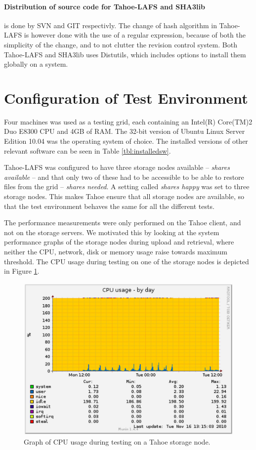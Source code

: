 \documentclass[english,12pt,a4paper]{book}
\begin{document}
\paragraph{Distribution of source code for Tahoe-LAFS and SHA3lib} is done by
\ac{SVN} and GIT respectivly. The change of hash algorithm in Tahoe-LAFS is
however done with the use of a regular expression, because of both the
simplicity of the change, and to not clutter the revision control system. Both
Tahoe-LAFS and SHA3lib uses \ac{Distutils}, which includes options to install
them globally on a system.

\section{Configuration of Test Environment}

Four machines was used as a testing grid, each containing an Intel(R) Core(TM)2
Duo E8300 \ac{CPU} and 4GB of \ac{RAM}. The 32-bit version of Ubuntu Linux
Server Edition 10.04 was the operating system of choice. The installed versions
of other relevant software can be seen in Table \ref{tbl:installedsw}.



Tahoe-\ac{LAFS} was configured to have three storage nodes available --
\emph{shares available} -- and that only two of these had to be accessible to be
able to restore files from the grid -- \emph{shares needed}. A setting called
\emph{shares happy} was set to three storage nodes. This makes Tahoe ensure that
all storage nodes are available, so that the test environment behaves the same
for all the different tests.

The performance measurements were only performed on the Tahoe client, and not on
the storage servers. We motivated this by looking at the system performance
graphs of the storage nodes during upload and retrieval, where neither the
\ac{CPU}, network, disk or memory usage raise towards maximum threshold. The
\ac{CPU} usage during testing on one of the storage nodes is depicted in Figure
\ref{fig:munin:storagenode}.

\begin{figure}[h!]
    \centering
    \includegraphics[width=0.8\columnwidth]{munin-tahoe05-cpuday.png}
    \caption{Graph of CPU usage during testing on a Tahoe storage node.}
    \label{fig:munin:storagenode}
\end{figure}
\end{document}
